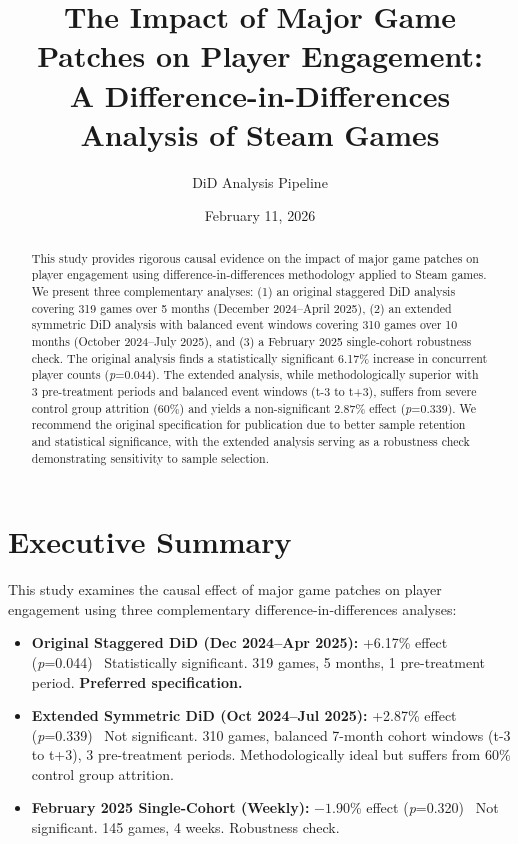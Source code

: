 \documentclass[12pt,a4paper]{article}
\title{\textbf{The Impact of Major Game Patches on Player Engagement:} \\ 
       A Difference-in-Differences Analysis of Steam Games}
\author{DiD Analysis Pipeline}
\date{February 11, 2026}
\begin{document}
\maketitle

\begin{abstract}
This study provides rigorous causal evidence on the impact of major game patches on player engagement using difference-in-differences methodology applied to Steam games. We present three complementary analyses: (1) an original staggered DiD analysis covering 319 games over 5 months (December 2024--April 2025), (2) an extended symmetric DiD analysis with balanced event windows covering 310 games over 10 months (October 2024--July 2025), and (3) a February 2025 single-cohort robustness check. The original analysis finds a statistically significant 6.17\% increase in concurrent player counts (\textit{p}=0.044). The extended analysis, while methodologically superior with 3 pre-treatment periods and balanced event windows (t-3 to t+3), suffers from severe control group attrition (60\%) and yields a non-significant 2.87\% effect (\textit{p}=0.339). We recommend the original specification for publication due to better sample retention and statistical significance, with the extended analysis serving as a robustness check demonstrating sensitivity to sample selection.
\end{abstract}

\clearpage
\tableofcontents
\clearpage

\section{Executive Summary}

This study examines the causal effect of major game patches on player engagement using three complementary difference-in-differences analyses:

\begin{itemize}
    \item \textbf{Original Staggered DiD (Dec 2024--Apr 2025):} +6.17\% effect (\textit{p}=0.044) \checkmark\ Statistically significant. 319 games, 5 months, 1 pre-treatment period. \textbf{Preferred specification.}
    
    \item \textbf{Extended Symmetric DiD (Oct 2024--Jul 2025):} +2.87\% effect (\textit{p}=0.339) \texttimes\ Not significant. 310 games, balanced 7-month cohort windows (t-3 to t+3), 3 pre-treatment periods. Methodologically ideal but suffers from 60\% control group attrition.
    
    \item \textbf{February 2025 Single-Cohort (Weekly):} $-1.90$\% effect (\textit{p}=0.320) \texttimes\ Not significant. 145 games, 4 weeks. Robustness check.
\end{itemize}
\end{document}
